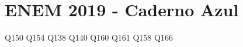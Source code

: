 \chapter{ENEM 2019 - Caderno Azul}

\begin{multicols}{2}
{Q150}
{Q154}
{Q138}
{Q140}
{Q160}
{Q161}
%
%
{Q158}
{Q166}
    
\end{multicols}



